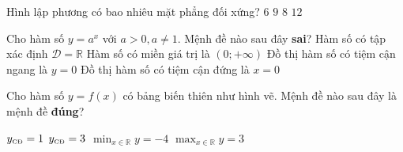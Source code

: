 \begin{ex}%
Hình lập phương có bao nhiêu mặt phẳng đối xứng?
\choice
{$6$}
{\True$9$}
{$8$}
{ $12$}
\end{ex} 

\begin{ex}%
Cho hàm số $y=a^x$ với $a>0 , a \neq 1$. Mệnh đề nào sau đây \textbf{sai}?
	\choice
	{Hàm số có tập xác định $\mathscr{D}=\mathbb{R}$}
	{Hàm số có miền giá trị là $\left(0; + \infty\right)$}
	{Đồ thị hàm số có tiệm cận ngang là $y=0$}
	{\True Đồ thị hàm số có tiệm cận đứng là $x=0$}
\end{ex} 
\begin{ex}%
Cho hàm số $y=f(x)$ có bảng biến thiên như hình vẽ. Mệnh đề nào sau đây là mệnh đề \textbf{đúng}?

\begin{center}
\end{center}

	\choice
	{$y_\text{{\tiny CĐ}}=1$}
	{\True $y_\text{{\tiny CĐ}}=3$}
	{$\displaystyle \min_{x\in \mathbb{R}}y=-4$}
	{ $\displaystyle \max_{x\in \mathbb{R}}y=3$}
\end{ex} 
